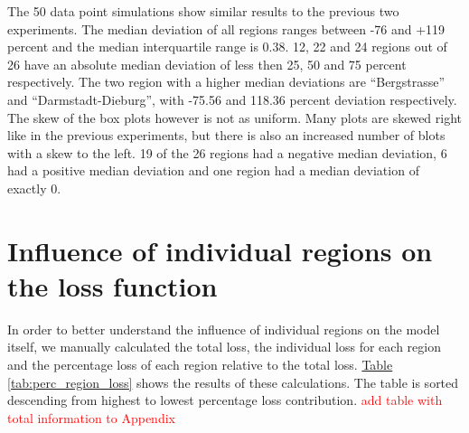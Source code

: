 The 50 data point simulations show similar results to the previous two experiments. The median deviation of all regions
ranges between -76 and +119 percent and the median interquartile range is 0.38. 12, 22 and 24 regions out of 26 have an
absolute median deviation of less then 25, 50 and 75 percent respectively. The two region with a higher median
deviations are ``Bergstrasse'' and ``Darmstadt-Dieburg'', with -75.56 and 118.36 percent deviation respectively.
The skew of the box plots however is not as uniform. Many plots are skewed right like in the previous experiments, but
there is also an increased number of blots with a skew to the left. 19 of the 26 regions had a negative median deviation,
6 had a positive median deviation and one region had a median deviation of exactly 0.



\section{Influence of individual regions on the loss function}
In order to better understand the influence of individual regions on the model itself, we manually calculated the total
loss, the individual loss for each region and the percentage loss of each region relative to the total loss.
\hyperref[tab:perc_region_loss]{Table \ref*{tab:perc_region_loss}} shows the results of these calculations. The table
is sorted descending from highest to lowest percentage loss contribution.
\textcolor{red}{add table with total information to Appendix}

